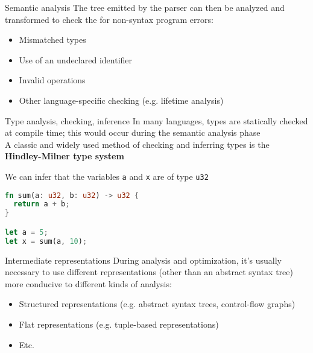 \documentclass[../index.tex]{subfiles}
\begin{document}
\renewcommand{\sectiontitle}{Semantic analysis}
\renewcommand{\currenttitle}{\sectiontitle}
\begin{frame}[fragile]{\currenttitle}
  The tree emitted by the parser can then be analyzed and transformed to check
  the for non-syntax program errors:

  \begin{itemize}
    \item Mismatched types
    \item Use of an undeclared identifier
    \item Invalid operations
    \item Other language-specific checking (e.g. lifetime analysis)
  \end{itemize}
\end{frame}
  
\renewcommand{\currenttitle}{Type analysis, checking, inference}
\begin{frame}[fragile]{\currenttitle}
  In many languages, types are statically checked at compile time; this would
  occur during the semantic analysis phase \\[2em]

  A classic and widely used method of checking and inferring types is the
  \textbf{Hindley-Milner type system}

  We can infer that the variables \texttt{a} and \texttt{x} are of type
  \texttt{u32} 

  \begin{lstlisting}[language=Rust, xleftmargin=5mm]
fn sum(a: u32, b: u32) -> u32 {
  return a + b;
}

let a = 5;
let x = sum(a, 10);
  \end{lstlisting}
\end{frame}
  
\renewcommand{\currenttitle}{Intermediate representations}
\begin{frame}[fragile]{\currenttitle}
  During analysis and optimization, it's usually necessary to use different
  representations (other than an abstract syntax tree) more conducive to
  different kinds of analysis:

  \begin{itemize}
    \item<2-> Structured representations (e.g. abstract syntax trees, control-flow
      graphs)
    \item<3-> Flat representations (e.g. tuple-based representations)
    \item<4-> Etc.
  \end{itemize}

\end{frame}
  
\end{document}
